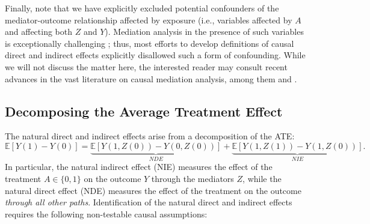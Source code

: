\documentclass[12pt, krantz2,]{krantz}
\theoremstyle{definition}
\theoremstyle{definition}
\theoremstyle{definition}
\newcommand{\E}{\mathbb{E}}
\newcommand{\1}{\mathbbm{1}}
\begin{document}
Finally, note that we have explicitly excluded potential confounders of the
mediator-outcome relationship affected by exposure (i.e., variables affected by
\(A\) and affecting both \(Z\) and \(Y\)). Mediation analysis in the presence of such
variables is exceptionally challenging \citep{avin2005identifiability}; thus, most
efforts to develop definitions of causal direct and indirect effects explicitly
disallowed such a form of confounding. While we will not discuss the matter
here, the interested reader may consult recent advances in the vast literature
on causal mediation analysis, among them \citet{diaz2020nonparametric} and
\citet{hejazi2021nonparametric}.

\hypertarget{decomposing-the-average-treatment-effect}{%
\subsection{Decomposing the Average Treatment Effect}\label{decomposing-the-average-treatment-effect}}

The natural direct and indirect effects arise from a decomposition of the ATE:
\begin{equation*}
  \E[Y(1) - Y(0)] =
    \underbrace{\E[Y(1, Z(0)) - Y(0, Z(0))]}_{NDE} +
    \underbrace{\E[Y(1, Z(1)) - Y(1, Z(0))]}_{NIE}.
\end{equation*}
In particular, the natural indirect effect (NIE) measures the effect of the
treatment \(A \in \{0, 1\}\) on the outcome \(Y\) through the mediators \(Z\), while
the natural direct effect (NDE) measures the effect of the treatment on the
outcome \emph{through all other paths}. Identification of the natural direct and
indirect effects requires the following non-testable causal assumptions:
\end{document}
